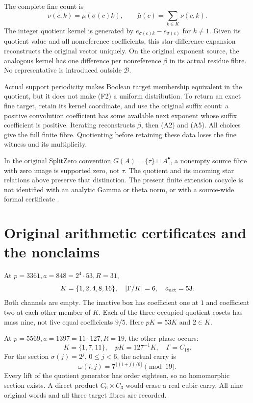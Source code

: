 The complete fine count is
\[
 \nu(c,k)=\mu(\sigma(c)k),\qquad
 \bar\mu(c)=\sum_{k\in K}\nu(c,k).                       \tag{F2}
\]
The integer quotient kernel is generated by
$e_{\sigma(c)k}-e_{\sigma(c)}$ for $k\ne1$. Given its quotient value and
all nonreference coefficients, this star-difference expansion reconstructs
the original vector uniquely. On the original exponent source, the analogous
kernel has one difference per nonreference $\beta$ in its actual residue
fibre. No representative is introduced outside $\mathcal B$.

Actual support periodicity makes Boolean target membership equivalent in the
quotient, but it does not make (F2) a uniform distribution. To return an exact
fine target, retain its kernel coordinate, and use the original suffix count:
a positive convolution coefficient has some available next exponent whose
suffix coefficient is positive. Iterating reconstructs $\beta$, then (A2)
and (A5). All choices give the full finite fibre. Quotienting before retaining
these data loses the fine witness and its multiplicity.

In the original SplitZero convention $G(A)=\{\tau\}\sqcup A^\bullet$,
a nonempty source fibre with zero image is supported zero, not $\tau$.
The quotient and its incoming star relations above preserve that distinction.
The present finite extension cocycle is not identified with an analytic
Gamma or theta norm, or with a source-wide formal certificate \cite{SplitZero}.

\section{Original arithmetic certificates and the nonclaims}
At $p=3361,a=848=2^4\cdot53,R=31$,
\[
 K=\{1,2,4,8,16\},\quad |\Gamma/K|=6,\quad a_{\rm act}=53.
\]
Both channels are empty. The inactive box has coefficient one at $1$ and
coefficient two at each other member of $K$. Each of the three occupied
quotient cosets has mass nine, not five equal coefficients $9/5$.
Here $pK=53K$ and $2\in K$.

At $p=5569,a=1397=11\cdot127,R=19$, the other phase occurs:
\[
 K=\{1,7,11\},\quad pK=127^{-1}K,\quad \Gamma=C_{18}.
\]
For the section $\sigma(j)=2^j$, $0\le j<6$, the actual carry is
\[
 \boxed{\omega(i,j)=7^{\lfloor(i+j)/6\rfloor}\pmod{19}.} \tag{F3}
\]
Every lift of the quotient generator has order eighteen, so no homomorphic
section exists. A direct product $C_6\times C_3$ would erase a real cubic
carry. All nine original words and all three target fibres are recorded.

